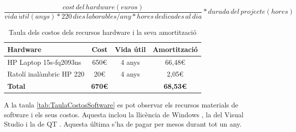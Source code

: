 \documentclass[a4paper]{article}
\begin{document}
\[
\frac{cost\, del\, hardware (euros)}{vida\, \acute{u}til (anys) * 220\, dies\, laborables/any * hores\, dedicades\, al\, dia} * durada\, del\, projecte (hores)
\]

\begin{table}[H]
    \begin{center}
        \begin{tabular}{|l|c|c|c|}
            \hline
            \rowcolor[HTML]{9B9B9B} 
            {\color[HTML]{000000} \textbf{Hardware}} & {\color[HTML]{000000} \textbf{Cost}} & {\color[HTML]{000000} \textbf{Vida útil}} & {\color[HTML]{000000} \textbf{Amortització}} \\ \hline
            HP Laptop 15s-fq2093ns                   & 650€                                 & 4 anys                                    & 66,48€                                       \\ \hline
            Ratolí inalàmbric HP 220                 & 20€                                  & 4 anys                                    & 2,05€                                        \\ \hline
            \rowcolor[HTML]{C0C0C0} 
            {\color[HTML]{000000} \textbf{Total}}    & {\color[HTML]{000000} \textbf{670€}}     & {\color[HTML]{000000} \textbf{}}          & {\color[HTML]{000000} \textbf{68,53€}}       \\ \hline
        \end{tabular}
        \caption{Taula dels costos dels recursos hardware i la seva amortització}
        \label{tab:TaulaCostosHardware}
    \end{center}
\end{table}

A la taula \ref{tab:TaulaCostosSoftware} es pot observar els recursos materials de software i els seus costos. Aquesta inclou la llicència de Windows \cite{Windows}, la del Visual Studio \cite{VisualStudio} i la de QT \cite{Qt}. Aquesta última s'ha de pagar per mesos durant tot un any.
\end{document}
